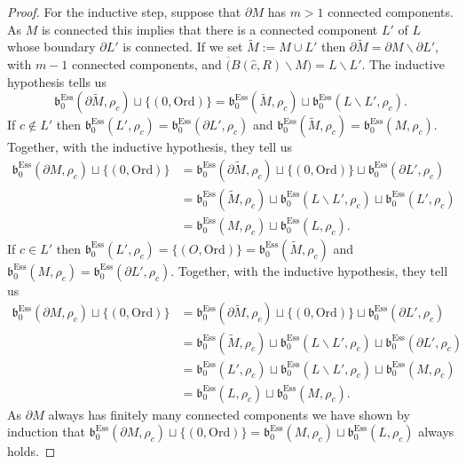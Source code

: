 \documentclass[a4paper,11pt]{article}
\theoremstyle{definition}
\newcommand{\Ord}{\textrm{Ord}}
\newcommand{\Ess}{\textrm{Ess}}
\begin{document}
\begin{proof}
For the inductive step, suppose that $\partial M$ has $m>1$ connected components. As $M$ is connected this implies that there is a connected component $L'$ of $L$ whose boundary $\partial L'$ is connected. If we set $\tilde{M}:=M\cup L'$ then $\partial \tilde{M}=\partial M \backslash \partial L'$, with $m-1$ connected components, and $\overline(B(\hat{c}, R)\backslash M)=L\backslash L'$. The inductive hypothesis tells us  $$\mathfrak{b}_0^{\Ess}(\partial \tilde{M},\rho_c) \sqcup \{(0, \Ord)\}=\mathfrak{b}_0^{\Ess}(\tilde{M},\rho_c)\sqcup \mathfrak{b}_0^{\Ess}(L\backslash L',\rho_c).$$ 
If $c\notin L'$ then $\mathfrak{b}_0^{\Ess}(L',\rho_c)=\mathfrak{b}_0^{\Ess}(\partial L',\rho_c)$ and $\mathfrak{b}_0^{\Ess}(\tilde{M},\rho_c)=\mathfrak{b}_0^{\Ess}(M,\rho_c)$. Together, with the inductive hypothesis, they tell us
\begin{align*}
    \mathfrak{b}_0^{\Ess}(\partial M,\rho_c) \sqcup \{(0, \Ord)\}&=\mathfrak{b}_0^{\Ess}(\partial \tilde{M},\rho_c) \sqcup \{(0, \Ord)\}\sqcup \mathfrak{b}_0^{\Ess}(\partial L',\rho_c)\\
    &=\mathfrak{b}_0^{\Ess}(\tilde{M},\rho_c)\sqcup \mathfrak{b}_0^{\Ess}(L\backslash L',\rho_c)\sqcup \mathfrak{b}_0^{\Ess}(L',\rho_c)\\
    &= \mathfrak{b}_0^{\Ess}(M,\rho_c)\sqcup \mathfrak{b}_0^{\Ess}(L,\rho_c).
\end{align*}
If $c\in L'$ then  $\mathfrak{b}_0^{\Ess}(L',\rho_c)=\{(O, \Ord)\}=\mathfrak{b}_0^{\Ess}(\tilde{M}, \rho_c)$ and $\mathfrak{b}_0^{\Ess}(M, \rho_c)=\mathfrak{b}_0^{\Ess}(\partial L',\rho_c)$. Together, with the inductive hypothesis, they tell us
\begin{align*}
    \mathfrak{b}_0^{\Ess}(\partial M,\rho_c) \sqcup \{(0, \Ord)\}&=\mathfrak{b}_0^{\Ess}(\partial \tilde{M},\rho_c) \sqcup \{(0, \Ord)\}\sqcup \mathfrak{b}_0^{\Ess}(\partial L',\rho_c)\\
    &=\mathfrak{b}_0^{\Ess}(\tilde{M},\rho_c)\sqcup \mathfrak{b}_0^{\Ess}(L\backslash L',\rho_c)\sqcup \mathfrak{b}_0^{\Ess}(\partial L',\rho_c)\\
    &= \mathfrak{b}_0^{\Ess}(L',\rho_c)\sqcup \mathfrak{b}_0^{\Ess}(L\backslash L',\rho_c)\sqcup \mathfrak{b}_0^{\Ess}(M, \rho_c)\\
    &=\mathfrak{b}_0^{\Ess}(L, \rho_c) \sqcup \mathfrak{b}_0^{\Ess}(M, \rho_c).
\end{align*}
As $\partial M$ always has finitely many connected components we have shown by induction that $\mathfrak{b}_0^{\Ess}(\partial M,\rho_c) \sqcup \{(0, \Ord)\}=\mathfrak{b}_0^{\Ess}(M,\rho_c)\sqcup \mathfrak{b}_0^{\Ess}(L,\rho_c)$ always holds.
 

\end{proof}
\end{document}
